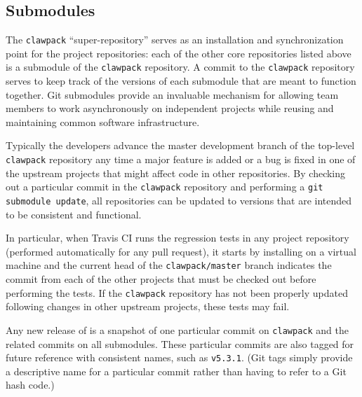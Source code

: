 \subsection{Submodules}

The \texttt{clawpack} ``super-repository'' serves as an
installation and synchronization point for the project repositories:
each of the other core \clawpack repositories listed above is a submodule
of the \texttt{clawpack} repository.  A commit to the \texttt{clawpack}
repository serves to keep track of the
versions of each submodule that are meant to function together.  
Git submodules provide an invaluable
mechanism for allowing \clawpack team members to work asynchronously on
independent projects while reusing and maintaining common software
infrastructure.

Typically the \clawpack developers advance the master development
branch of the top-level \texttt{clawpack}
repository any time a major feature is added
or a bug is fixed in one of the upstream projects that might affect code in
other repositories.  By checking out a particular commit in the
\texttt{clawpack} repository and performing a \texttt{git submodule update},
all repositories can be updated to versions that are intended to be
consistent and functional.

In particular, when Travis CI runs the regression tests in any project
repository (performed automatically for any pull request), it starts
by installing \clawpack on a virtual machine and the current head
of the \texttt{clawpack/master} branch indicates the commit from each of the
other projects that must be checked out before performing the tests.
If the \texttt{clawpack} repository has not been properly updated
following changes in other upstream projects, these tests may fail.

Any new release of \clawpack is a snapshot of one particular commit on
\texttt{clawpack} and the related commits on all submodules.  These
particular commits are also tagged for future reference with consistent
names, such as \texttt{v5.3.1}.  (Git tags simply provide a descriptive name
for a particular commit rather than having to refer to a Git hash code.)


